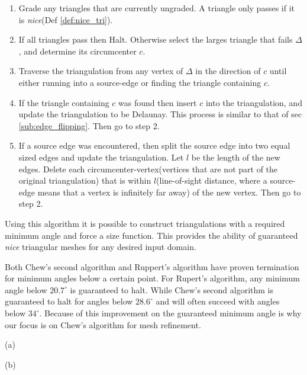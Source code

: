 \documentclass[../fem.tex]{subfiles}
\begin{document}
\begin{enumerate}[label=\arabic*.]
  \item Grade any triangles that are currently ungraded. A triangle only passes
    if it is \textit{nice}(Def \ref{def:nice_tri}).
  \item If all triangles pass then Halt. Otherwise select the larges triangle
    that fails $\Delta$, and determine its circumcenter $c$.
  \item Traverse the triangulation from any vertex of $\Delta$ in the direction
    of $c$ until either running into a source-edge or finding the triangle
    containing $c$.
  \item If the triangle containing $c$ was found then insert $c$ into the
    triangulation, and update the triangulation to be Delaunay. This process is
    similar to that of sec \ref{sub:edge_flipping}. Then go to step 2.
  \item If a source edge was encountered, then split the source edge into two
    equal sized edges and update the triangulation. Let $l$ be the length of
    the new edges. Delete each circumcenter-vertex(vertices that are not part
    of the original triangulation) that is within $l$(line-of-sight distance,
    where a source-edge means that a vertex is infinitely far away) of the new
    vertex. Then go to step 2.
\end{enumerate}

Using this algorithm it is possible to construct triangulations with a required
minimum angle and force a size function. This provides the ability of
guaranteed \textit{nice} triangular meshes for any desired input domain.

Both Chew's second algorithm and Ruppert's algorithm have proven termination
for minimum angles below a certain point. For Rupert's algorithm, any minimum
angle below $20.7^{\circ}$ is guaranteed to halt. While Chew's second algorithm
is guaranteed to halt for angles below $28.6^{\circ}$ and will often succeed
with angles below $34^{\circ}$. Because of this improvement on the guaranteed
minimum angle is why our focus is on Chew's algorithm for mesh refinement.

\begin{Figure}
   \begin{center}
     \begin{minipage}{0.4\textwidth}
       \begin{center}
         
         (a)
       \end{center}
     \end{minipage}
     \begin{minipage}{0.4\textwidth}
       \begin{center}
         
         (b)
       \end{center}
     \end{minipage}
   \end{center}
\end{Figure}
\end{document}
